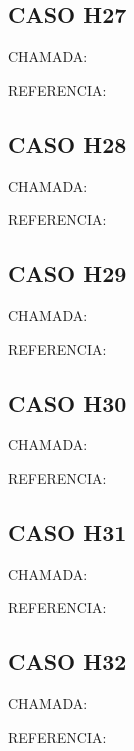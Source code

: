 \documentclass{undftex}
\begin{document}
\begin{refsection}\section*{CASO H27} CHAMADA: \par REFERENCIA:\par\printbibliography[heading=none]\end{refsection}\clearpage
\begin{refsection}\section*{CASO H28} CHAMADA: \par REFERENCIA:\par\printbibliography[heading=none]\end{refsection}\clearpage
\begin{refsection}\section*{CASO H29} CHAMADA: \par REFERENCIA:\par\printbibliography[heading=none]\end{refsection}\clearpage
\begin{refsection}\section*{CASO H30} CHAMADA: \par REFERENCIA:\par\printbibliography[heading=none]\end{refsection}\clearpage
\begin{refsection}\section*{CASO H31} CHAMADA: \par REFERENCIA:\par\printbibliography[heading=none]\end{refsection}\clearpage
\begin{refsection}\section*{CASO H32} CHAMADA: \par REFERENCIA:\par\printbibliography[heading=none]\end{refsection}\clearpage
\end{document}
